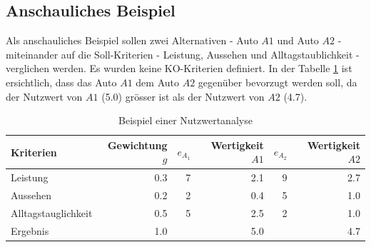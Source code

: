   \subsection{Anschauliches Beispiel}
  
  Als anschauliches Beispiel sollen zwei Alternativen - Auto \(A1\) und Auto
  \(A2\) - miteinander auf die Soll-Kriterien - Leistung, Aussehen und
  Alltagstaublichkeit - verglichen werden. Es wurden keine KO-Kriterien
  definiert. In der Tabelle \ref{tab:beispielNwa} ist ersichtlich, dass das
  Auto \(A1\) dem Auto \(A2\) gegenüber bevorzugt werden soll, da der Nutzwert
  von \(A1\) (5.0) grösser ist als der Nutzwert von \(A2\) (4.7).
  \newline
  
  \begin{table}[h!]
    \sffamily 
    \begin{center}
      \begin{tabular}{lrrrrr}
        \toprule
        \textbf{Kriterien} & \textbf{Gewichtung \(g\)} & \textbf{\(e_A_1\)} &
        \textbf{Wertigkeit \(A1\)} & \textbf{\(e_A_2\)} & \textbf{Wertigkeit
        \(A2\)}\\
        \midrule
        Leistung            & 0.3 & 7 & 2.1 & 9 & 2.7 \\
        Aussehen            & 0.2 & 2 & 0.4 & 5 & 1.0 \\
        Alltagstauglichkeit & 0.5 & 5 & 2.5 & 2 & 1.0 \\
        \midrule
        \midrule
        Ergebnis            & 1.0 &   & 5.0 &   & 4.7 \\
        \bottomrule
      \end{tabular}
      \caption{Beispiel einer Nutzwertanalyse}
      \label{tab:beispielNwa}
    \end{center}
  \end{table}
  
